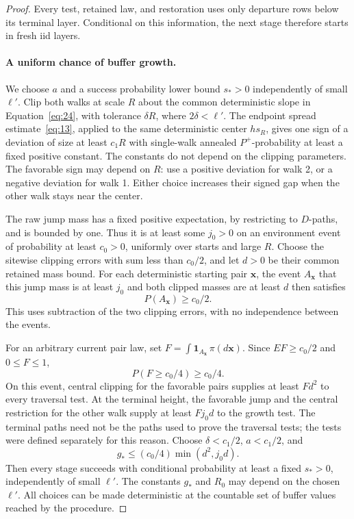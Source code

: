 \begin{proof}
Every test, retained law, and restoration uses only departure rows
below its terminal layer. Conditional on this information, the next
stage therefore starts in fresh iid layers.

\paragraph{A uniform chance of buffer growth.}
We choose \(a\) and a success probability lower bound \(s_*>0\)
independently of small \(\ell'\). Clip both walks at scale \(R\)
about the common deterministic slope in Equation~\eqref{eq:24}, with
tolerance \(\delta R\), where \(2\delta<\ell'\). The endpoint
spread estimate~\eqref{eq:13}, applied to the same deterministic
center \(hs_R\), gives one sign of a deviation of size at least
\(c_1R\) with single-walk annealed \(P^+\)-probability at least a
fixed positive constant. The constants do not depend on the clipping
parameters. The favorable sign may depend on \(R\): use a positive
deviation for walk 2, or a negative deviation for walk 1. Either choice
increases their signed gap when the other walk stays near the center.

The raw jump mass has a fixed positive expectation, by restricting to
\(D\)-paths, and is bounded by one. Thus it is at least some
\(j_0>0\) on an environment event of probability at least
\(c_0>0\), uniformly over starts and large \(R\). Choose the
sitewise clipping errors with sum less than \(c_0/2\), and let
\(d>0\) be their common retained mass bound. For each deterministic
starting pair \(\mathbf x\), the event \(A_{\mathbf x}\) that
this jump mass is at least \(j_0\) and both clipped masses are at
least \(d\) then satisfies
\[
P(A_{\mathbf x})\ge c_0/2.
\]
This uses subtraction of the two clipping errors, with no independence
between the events.

For an arbitrary current pair law, set
\(F=\int\mathbf1_{A_{\mathbf x}}\,\pi(d\mathbf x)\).
Since \(EF\ge c_0/2\) and \(0\le F\le1\),
\[
P(F\ge c_0/4)\ge c_0/4.
\]
On this event, central clipping for the favorable pairs supplies at
least \(Fd^2\) to every traversal test. At the terminal height,
the favorable jump and the central restriction for the other walk
supply at least \(Fj_0d\) to the growth test. The terminal paths
need not be the paths used to prove the traversal tests; the tests
were defined separately for this reason. Choose \(\delta<c_1/2\),
\(a<c_1/2\), and
\[
g_*\le(c_0/4)\min(d^2,j_0d).
\]
Then every stage succeeds with conditional probability at least a
fixed \(s_*>0\), independently of small \(\ell'\). The constants
\(g_*\) and \(R_0\) may depend on the chosen \(\ell'\).
All choices can be made deterministic at the countable set of buffer
values reached by the procedure.


\end{proof}
